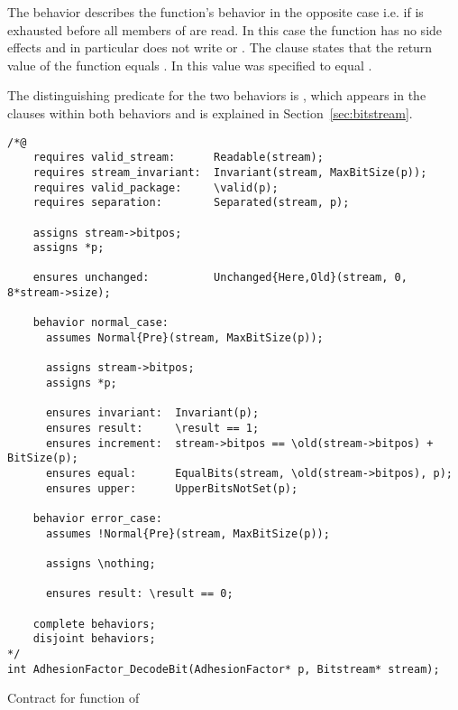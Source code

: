 The behavior  describes the function's behavior in the opposite case
i.e. if  is exhausted before all members of  are read.
In this case the function has no side effects and in particular does not write
 or .
The  clause  states that the return value
of the function equals . In  this value was specified to equal .

The distinguishing predicate for the two behaviors is ,
which appears in the  clauses within both behaviors and
is explained in Section~\ref{sec:bitstream}. 




\begin{listing}[hbt]
\begin{minipage}{0.99\textwidth}
\begin{lstlisting}[style=acsl-block]
/*@
    requires valid_stream:      Readable(stream);
    requires stream_invariant:  Invariant(stream, MaxBitSize(p));
    requires valid_package:     \valid(p);
    requires separation:        Separated(stream, p);

    assigns stream->bitpos;
    assigns *p;

    ensures unchanged:          Unchanged{Here,Old}(stream, 0, 8*stream->size);

    behavior normal_case:
      assumes Normal{Pre}(stream, MaxBitSize(p));

      assigns stream->bitpos;
      assigns *p;

      ensures invariant:  Invariant(p);
      ensures result:     \result == 1;
      ensures increment:  stream->bitpos == \old(stream->bitpos) + BitSize(p);
      ensures equal:      EqualBits(stream, \old(stream->bitpos), p);
      ensures upper:      UpperBitsNotSet(p);

    behavior error_case:
      assumes !Normal{Pre}(stream, MaxBitSize(p));

      assigns \nothing;

      ensures result: \result == 0;

    complete behaviors;
    disjoint behaviors;
*/
int AdhesionFactor_DecodeBit(AdhesionFactor* p, Bitstream* stream);
\end{lstlisting}
\end{minipage}
\caption{\label{lst:adhesionfactor-decodebit}Contract for  function of }
\end{listing}


